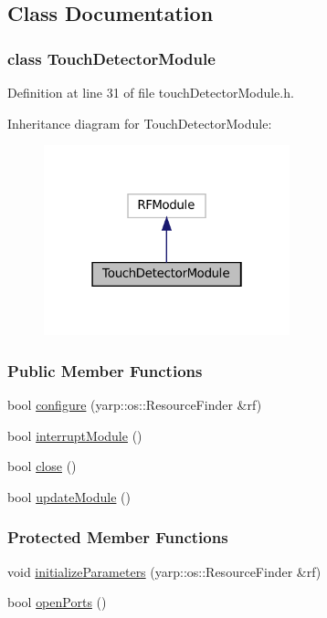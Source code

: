 \subsection{Class Documentation}
\label{classTouchDetectorModule}
\subsubsection{class Touch\+Detector\+Module}


Definition at line 31 of file touch\+Detector\+Module.\+h.



Inheritance diagram for Touch\+Detector\+Module\+:
\nopagebreak
\begin{figure}[H]
\begin{center}
\leavevmode
\includegraphics[width=202pt]{classTouchDetectorModule__inherit__graph}
\end{center}
\end{figure}
\subsubsection*{Public Member Functions}
\begin{DoxyCompactItemize}
\item 
bool \hyperlink{group__touchDetector_a1a5c65d2f0a5ae991ccfeffaeef9c6da}{configure} (yarp\+::os\+::\+Resource\+Finder \&rf)
\item 
bool \hyperlink{group__touchDetector_a76c20d89ce3e6b39b17ea7d0d8f37f0b}{interrupt\+Module} ()
\item 
bool \hyperlink{group__touchDetector_a51c73b35562b816cc3f2bf830f803e8b}{close} ()
\item 
bool \hyperlink{group__touchDetector_af4e0e9b987ca4acc22f28120e8dc2ad5}{update\+Module} ()
\end{DoxyCompactItemize}
\subsubsection*{Protected Member Functions}
\begin{DoxyCompactItemize}
\item 
void \hyperlink{group__touchDetector_ae9d686d64051b28eef130873349ef574}{initialize\+Parameters} (yarp\+::os\+::\+Resource\+Finder \&rf)
\item 
bool \hyperlink{group__touchDetector_a3d6655dced4f57eb35e80a20afe6036b}{open\+Ports} ()
\end{DoxyCompactItemize}
